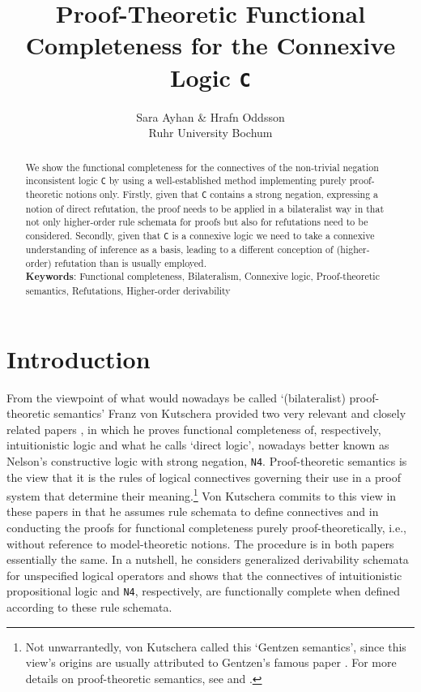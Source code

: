 \documentclass{article}%
\theoremstyle{break}
\begin{document}
\title{Proof-Theoretic Functional Completeness for the Connexive Logic \texttt{C}}



\author{Sara Ayhan \& Hrafn Oddsson\\ Ruhr University Bochum}
\date{}
\maketitle



\begin{abstract}
We show the functional completeness for the connectives of the non-trivial negation inconsistent logic \texttt{C} by using a well-established method implementing purely proof-theoretic notions only. Firstly, given that \texttt{C} contains a strong negation, expressing a notion of direct refutation, the proof needs to be applied in a bilateralist way in that not only higher-order rule schemata for proofs but also for refutations need to be considered. Secondly, given that \texttt{C} is a connexive logic we need to take a connexive understanding of inference as a basis, leading to a different conception of (higher-order) refutation than is usually employed. 
\\
\textbf{Keywords}: Functional completeness, Bilateralism, Connexive logic, Proof-theoretic semantics, Refutations, Higher-order derivability
\end{abstract}


\section{Introduction}
From the viewpoint of what would nowadays be called `(bilateralist) proof-theoretic semantics' Franz von Kutschera provided two very relevant and closely related papers \cite{Kutschera1968,Kutschera1969}, in which he proves functional completeness of, respectively, intuitionistic logic and what he calls `direct logic', nowadays better known as Nelson's constructive logic with strong negation, \texttt{N4}.
Proof-theoretic semantics is the view that it is the rules of logical connectives governing their use in a proof system that determine their meaning.\footnote{Not unwarrantedly, von Kutschera called this `Gentzen semantics', since this view's origins are usually attributed to Gentzen's famous paper \cite{Gentzen1934}. For more details on proof-theoretic semantics, see \cite{s-h} and \cite{Francez2015}.}
Von Kutschera commits to this view in these papers in that he assumes rule schemata to define connectives and in conducting the proofs for functional completeness purely proof-theoretically, i.e., without reference to model-theoretic notions.
The procedure is in both papers essentially the same.
In a nutshell, he considers generalized derivability schemata for unspecified logical operators and shows that the connectives of intuitionistic propositional logic and \texttt{N4}, respectively, are functionally complete when defined according to these rule schemata.
\end{document}
